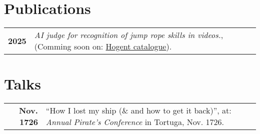 \documentclass[grey]{hipstercv}
\begin{document}
\begin{paracol}{2}
\begin{minipage}[t]{0.16\textwidth}
\end{minipage}

\vspace{4em}




\begin{minipage}[t]{0.3\textwidth}
\section*{Publications}
\begin{tabular}{>{\footnotesize\bfseries}r >{\footnotesize}p{}}
    2025 & \emph{AI judge for recognition of jump rope
skills in videos.}, (Comming soon on: \href{https://www.hogent.be/student/bibliotheken/}{Hogent catalogue}). \\
\end{tabular}
\section*{Talks}
\begin{tabular}{>{\footnotesize\bfseries}r >{\footnotesize}p{}}
    Nov. 1726 & ``How I lost my ship (\& and how to get it back)'', at: \emph{Annual Pirate's Conference} in Tortuga, Nov. 1726.
\end{tabular}
\end{minipage}








\end{paracol}
\end{document}

